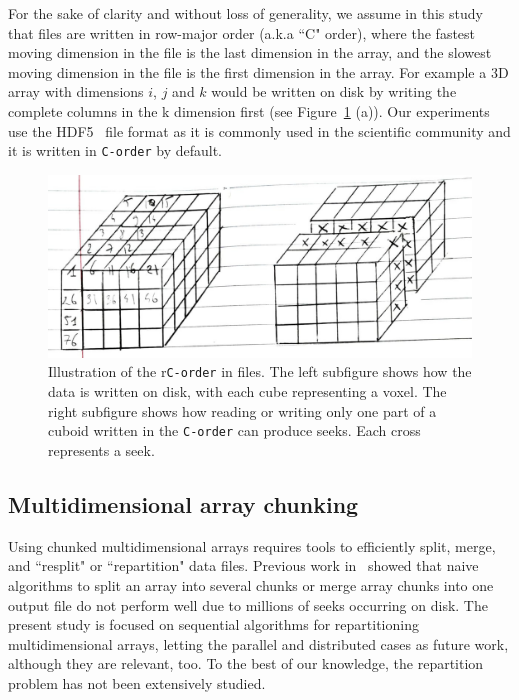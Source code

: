 \documentclass[conference]{IEEEtran}
\begin{document}
For the sake of clarity and without loss of generality,
 we assume in this study that files are written in row-major order (a.k.a
``C" order), where the fastest moving dimension in the file is the last
dimension in the array, and the slowest moving dimension in the file is the first
dimension in the array. For example a 3D array with dimensions $i$, $j$ and $k$
would be written on disk by writing the complete columns in the k dimension first
(see Figure~\ref{fig:seeks_and_rowmajor} (a)).
Our experiments use the HDF5~\cite{hdf5} file format as it is commonly used in the
scientific community and it is written in \texttt{C-order} by default.

\begin{figure}[h]
  \centering
  \includegraphics[scale=0.35]{./figures/new/seeks_and_rowmajor.jpeg}
  \caption{Illustration of the r\texttt{C-order} in files. The left subfigure
  shows how the data is written on disk, with each cube representing a voxel. The
  right subfigure shows how reading or writing only one part of a cuboid written
  in the \texttt{C-order} can produce seeks. Each cross represents a seek.}
  \label{fig:seeks_and_rowmajor}
\end{figure}

\subsection{Multidimensional array chunking}

Using chunked multidimensional arrays requires tools to efficiently split,
merge, and ``resplit" or ``repartition" data files. Previous work in~\cite{seqalgorithms}
showed that naive algorithms to split an array into several chunks or merge
array chunks into one output file do not perform well due to millions of seeks
occurring on disk. The present study is focused on sequential algorithms for
repartitioning multidimensional arrays, letting the parallel and distributed
cases as future work, although they are relevant, too. To the best of our
knowledge, the repartition problem has not been extensively studied.
\end{document}
